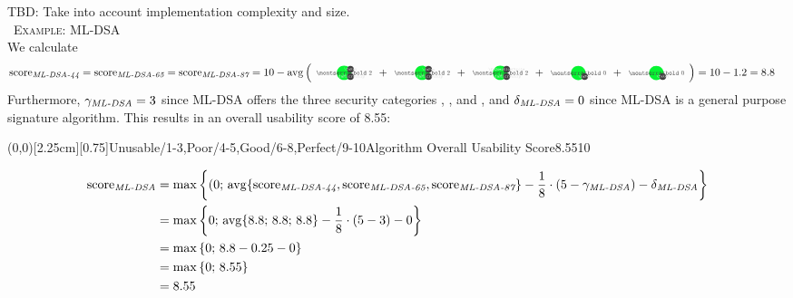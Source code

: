 \documentclass[11pt,english,a4paper, landscape]{scrartcl}
\begin{document}
   \textcolor{themeaccentsecondary}{TBD: Take into account implementation complexity and size.}\\

	{\large \scshape \faInfo\, Example: ML-DSA}\\

	We calculate
	\begin{align*}
		\textnormal{score\textsubscript{\itshape ML-DSA-44}} = \textnormal{score\textsubscript{\itshape ML-DSA-65}} =\textnormal{score\textsubscript{\itshape ML-DSA-87}}&= 10 - \avg\left({\scriptsize
		\tripleicon{\montserratbold 2}{\faMicrochip}{themegreen}{0.6}{\faKey} + %
		\tripleicon{\montserratbold 2}{\faMicrochip}{themegreen}{0.6}{\faPen} + %
		\tripleicon{\montserratbold 2}{\faMicrochip}{themegreen}{0.6}{\faQuestionCircle} + %
		\doubleicon{\montserratbold 0}{\faPen}{themegreen}{0.6}+ %
		\doubleicon{\montserratbold 0}{\faKey}{themegreen}{0.6}
		}\right) = 10 - 1.2 = 8.8
	\end{align*}
Furthermore, $\gamma_\textnormal{\itshape ML-DSA} = 3$ since ML-DSA offers the three security categories \hspace{-1mm}, \hspace{-1mm}, and \hspace{-1mm}, and
	$\delta_\textnormal{\itshape ML-DSA} = 0$ since ML-DSA is a general purpose signature algorithm. This results in an overall usability score of 8.55:\\

	\begin{minipage}[T]{0.25\textwidth}
		\GreenAbsoluteSpeedometer(0,0)[2.25cm][0.75]{Unusable/1-3,Poor/4-5,Good/6-8,Perfect/9-10}{Algorithm Overall Usability Score}{8.55}{10}{\tiny}{\tiny \montserratsemibold}
	\end{minipage}
	\hfill
	\begin{minipage}[T]{0.75\textwidth}
	\vspace{-\baselineskip}
		\begin{align*}
			\textnormal{score\textsubscript{\itshape ML-DSA}} &= \max\left\{(0;\,\operatorname{avg}\{\textnormal{score}_\textnormal{\itshape ML-DSA-44},\textnormal{score}_\textnormal{\itshape ML-DSA-65},\textnormal{score}_\textnormal{\itshape ML-DSA-87}\} - \frac{1}{8}\cdot\left(5-\gamma_\textnormal{\itshape ML-DSA}\right) - \delta_\textnormal{\itshape ML-DSA}\right\}\\
			&=\max\left\{0;\,\operatorname{avg}\{8.8;\,8.8;\,8.8\} - \frac{1}{8}\cdot\left(5-3\right) - 0\right\}\\
			&=\max\left\{0;\,8.8 - 0.25 - 0\right\}\\
			&=\max\left\{0;\,8.55\right\}\\
			&=8.55
		\end{align*}
	\end{minipage}
\end{document}
